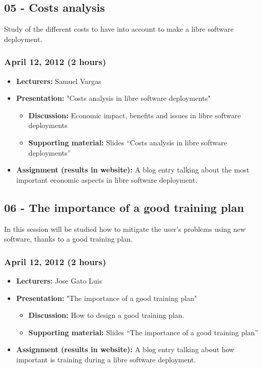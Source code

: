 \documentclass[a4paper]{article}
\begin{document}
\subsection{05 - Costs analysis }

Study of the different costs to have into account to make a libre software deployment. 

\subsubsection{April 12, 2012 (2 hours)}

\begin{itemize}
\item \textbf{Lecturers:} Samuel Vargas
\item \textbf{Presentation:} "Costs analysis in libre software deployments"
  \begin{itemize}
  \item \textbf{Discussion:} Economic impact, benefits and issues in libre software deployments
  \item \textbf{Supporting material:} Slides ``Costs analysis in libre software deployments''
  \end{itemize}
\item \textbf{Assignment (results in website):} A blog entry talking about the most important economic aspects in libre software deployment.
\end{itemize}


\subsection{06 - The importance of a good training plan }

In this session will be studied how to mitigate the user's problems using new software, thanks to a good training plan.  

\subsubsection{April 12, 2012 (2 hours)}

\begin{itemize}
\item \textbf{Lecturers:} Jose Gato Luis
\item \textbf{Presentation:} "The importance of a good training plan"
  \begin{itemize}
  \item \textbf{Discussion:} How to design a good training plan. 
  \item \textbf{Supporting material:} Slides ``The importance of a good training plan''
  \end{itemize}
\item \textbf{Assignment (results in website):} A blog entry talking about how important is training during a libre software deployment. 
\end{itemize}
\end{document}
